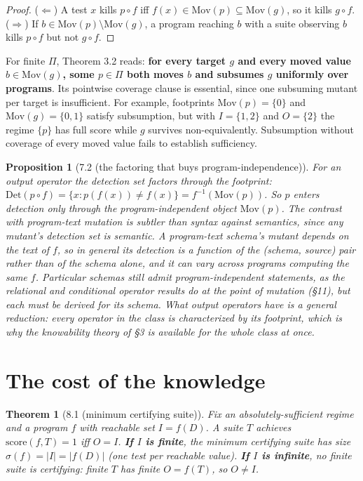 \documentclass[conference]{IEEEtran}
\newcommand{\Mov}{\mathrm{Mov}}
\newcommand{\Det}{\mathrm{Det}}
\newcommand{\score}{\mathrm{score}}
\theoremstyle{run}
\newtheorem*{theorem}{Theorem}
\newtheorem*{proposition}{Proposition}
\begin{document}
\begin{proof}
($\Leftarrow$) A test $x$ kills $p\circ f$ iff $f(x) \in \Mov(p) \subseteq \Mov(g)$, so it kills $g\circ f$. ($\Rightarrow$) If $b \in \Mov(p)\setminus\Mov(g)$, a program reaching $b$ with a suite observing $b$ kills $p\circ f$ but not $g\circ f$.
\end{proof}

For finite $\Pi$, Theorem 3.2 reads: \textbf{for every target $g$ and every moved value $b\in\Mov(g)$, some $p\in\Pi$ both moves $b$ and subsumes $g$ uniformly over programs}. Its pointwise coverage clause is essential, since one subsuming mutant per target is insufficient. For example, footprints $\Mov(p)=\{0\}$ and $\Mov(g)=\{0,1\}$ satisfy subsumption, but with $I=\{1,2\}$ and $O=\{2\}$ the regime $\{p\}$ has full score while $g$ survives non-equivalently. Subsumption without coverage of every moved value fails to establish sufficiency.

\begin{proposition}[7.2 (the factoring that buys program-independence)]
For an output operator the detection set factors through the footprint: $\Det(p\circ f) = \{x : p(f(x)) \neq f(x)\} = f^{-1}(\Mov(p))$. So $p$ enters detection only through the program-independent object $\Mov(p)$. The contrast with program-text mutation is subtler than syntax against semantics, since any mutant's detection set is semantic. A program-text schema's mutant depends on the \emph{text} of $f$, so in general its detection is a function of the (schema, source) pair rather than of the schema alone, and it can vary across programs computing the same $f$. Particular schemas still admit program-independent statements, as the relational and conditional operator results do at the point of mutation (\S 11), but each must be derived for its schema. What output operators have is a general reduction: every operator in the class is characterized by its footprint, which is why the knowability theory of \S 3 is available for the whole class at once.
\end{proposition}

\setcounter{section}{7}
\section{The cost of the knowledge}
\begin{theorem}[8.1 (minimum certifying suite)]
Fix an absolutely-sufficient regime and a program $f$ with reachable set $I = f(D)$. A suite $T$ achieves $\score(f,T) = 1$ iff $O = I$. \textbf{If $I$ is finite}, the minimum certifying suite has size $\sigma(f) = |I| = |f(D)|$ (one test per reachable value). \textbf{If $I$ is infinite}, no finite suite is certifying: finite $T$ has finite $O = f(T)$, so $O \neq I$.
\end{theorem}
\end{document}
